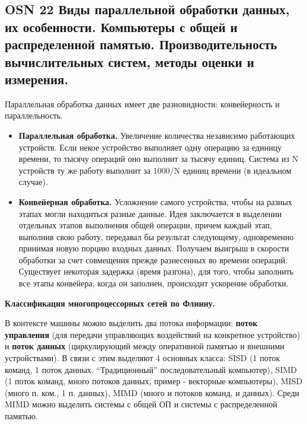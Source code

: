 \subsection*{OSN 22 Виды параллельной обработки данных, их особенности. Компьютеры с общей и распределенной памятью. Производительность вычислительных систем, методы оценки и измерения.}


Параллельная обработка данных имеет две разновидности: конвейерность и параллельность.
\begin{itemize}
    \item \textbf{Параллельная обработка.} Увеличение количества независимо работающих устройств. Если некое устройство выполняет одну операцию за единицу времени, то тысячу операций оно выполнит за тысячу единиц. Система из N устройств ту же работу выполнит за 1000/N единиц времени (в идеальном случае).
    \item \textbf{Конвейерная обработка.} Усложнение самого устройства, чтобы на разных этапах могли находиться разные данные. Идея заключается в выделении отдельных этапов выполнения общей операции, причем каждый этап, выполнив свою работу, передавал бы результат следующему, одновременно принимая новую порцию входных данных. Получаем выигрыш в скорости обработки за счет совмещения прежде разнесенных во времени операций. Существует некоторая задержка (время разгона), для того, чтобы заполнить все этапы конвейера; когда он заполнен, происходит ускорение обработки.
\end{itemize}

\textbf{Классификация многопроцессорных сетей по Флинну.}

В контексте машины можно выделить два потока информации: \textbf{поток управления} (для передачи управляющих воздействий на конкретное устройство) и \textbf{поток данных} (циркулирующий между оперативной памятью и внешними устройствами). В связи с этим выделяют 4 основных класса: SISD (1 поток команд, 1 поток данных. ``Традиционный'' последовательный компьютер), SIMD (1 поток команд, много потоков данных, пример - векторные компьютеры), MISD (много п. ком., 1 п. данных), MIMD (много и потоков команд, и данных). Среди MIMD можно выделить системы с общей ОП и системы с распределенной памятью.

